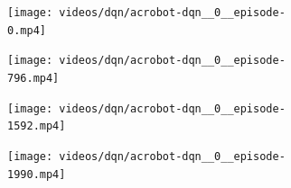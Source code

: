\documentclass[
  letterpaper,
  DIV=11,
  numbers=noendperiod,
  oneside]{scrartcl}
\begin{document}
\begin{figure}

\begin{minipage}{0.50\linewidth}

\begin{figure}[H]

{\centering \texttt{[image: videos/dqn/acrobot-dqn\_\_0\_\_episode-0.mp4]}

}


\end{figure}%

\end{minipage}%
%
\begin{minipage}{0.50\linewidth}

\begin{figure}[H]

{\centering \texttt{[image: videos/dqn/acrobot-dqn\_\_0\_\_episode-796.mp4]}

}


\end{figure}%

\end{minipage}%
\newline
\begin{minipage}{0.50\linewidth}

\begin{figure}[H]

{\centering \texttt{[image: videos/dqn/acrobot-dqn\_\_0\_\_episode-1592.mp4]}

}


\end{figure}%

\end{minipage}%
%
\begin{minipage}{0.50\linewidth}

\begin{figure}[H]

{\centering \texttt{[image: videos/dqn/acrobot-dqn\_\_0\_\_episode-1990.mp4]}

}


\end{figure}%

\end{minipage}%

\end{figure}%
\end{document}
